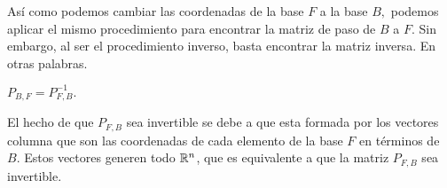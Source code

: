 Así como podemos cambiar las coordenadas de la base $F$ a la base $B,$ podemos aplicar el mismo procedimiento para
encontrar la matriz de paso de $B$ a $F$. Sin embargo, al ser el procedimiento inverso, basta encontrar la matriz
inversa. En otras palabras.

\begin{proposicion}
\label{PBF}
 $P_{B,F}=P_{F,B}^{-1}.$
\end{proposicion}

\begin{observacion}
 El hecho de que $P_{F,B}$ sea invertible se debe a que esta formada por los vectores columna que son las coordenadas
de cada elemento de la base $F$ en términos de $B.$ Estos vectores generen todo $\mathbb{R}^{n}$, que es equivalente a
que la matriz $P_{F,B}$ sea invertible.
\end{observacion}

